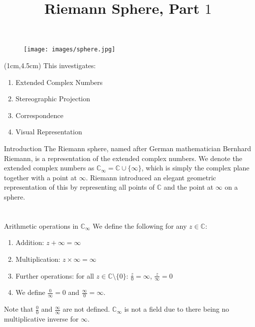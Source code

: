 \documentclass{beamer}
\title{Riemann Sphere, Part $1$}
\author{}
\date{}
\begin{document}
\begin{frame}
    \titlepage 
    
    \begin{wrapfigure}{r}{0.25\textwidth}
    \centering
    \texttt{[image: images/sphere.jpg]}
    
    
\end{wrapfigure}
\begin{textblock*}{10cm}(1cm,4.5cm)
This investigates:
\begin{enumerate}
        \item Extended Complex Numbers
        \item Stereographic Projection
        \item Correspondence 
        \item Visual Representation
    \end{enumerate}
\end{textblock*}    
\end{frame}

\logo{}


\begin{frame}{Introduction}
The Riemann sphere, named after German mathematician Bernhard Riemann, is a representation of the extended complex numbers. We denote the extended complex numbers as $\mathbb{C}_{\infty}=\mathbb{C}\cup\{\infty\}$, which is simply the complex plane together with a point at $\infty$. Riemann introduced an elegant geometric representation of this by representing all points of $\mathbb{C}$ and the point at $\infty$ on a sphere.
\end{frame}


\section{}
\begin{frame}{Arithmetic operations in $\mathbb{C}_{\infty}$}
We define the following for any $z\in\mathbb{C}$:
\begin{enumerate}
    \item Addition: $z+\infty=\infty$
    \item Multiplication: $z\times\infty=\infty$
    \item Further operations: for all $z\in\mathbb{C}\setminus\{0\}$:
    $\frac{z}{0}=\infty$, $\frac{z}{\infty}=0$
    \item We define $\frac{0}{\infty}=0$ and $\frac{\infty}{0}=\infty$.
\end{enumerate} 



   Note that $\frac{0}{0}$ and $\frac{\infty}{\infty}$ are not defined.
     $\mathbb{C_{\infty}}$ is not a field due to there being no multiplicative inverse for $\infty$.


\end{frame}
    
\end{document}
